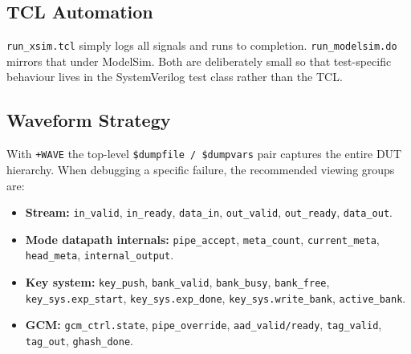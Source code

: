 \documentclass[conference,10pt,a4paper]{IEEEtran}
\begin{document}
\subsection{TCL Automation}
\texttt{run\_xsim.tcl} simply logs all signals and runs to completion.
\texttt{run\_modelsim.do} mirrors that under ModelSim.  Both are
deliberately small so that test-specific behaviour lives in the
SystemVerilog test class rather than the TCL.

\subsection{Waveform Strategy}
With \texttt{+WAVE} the top-level \texttt{\$dumpfile / \$dumpvars} pair
captures the entire DUT hierarchy.  When debugging a specific failure,
the recommended viewing groups are:
\begin{itemize}[leftmargin=*]
  \item \textbf{Stream:} \texttt{in\_valid}, \texttt{in\_ready},
        \texttt{data\_in}, \texttt{out\_valid}, \texttt{out\_ready},
        \texttt{data\_out}.
  \item \textbf{Mode datapath internals:} \texttt{pipe\_accept},
        \texttt{meta\_count}, \texttt{current\_meta}, \texttt{head\_meta},
        \texttt{internal\_output}.
  \item \textbf{Key system:} \texttt{key\_push}, \texttt{bank\_valid},
        \texttt{bank\_busy}, \texttt{bank\_free},
        \texttt{key\_sys.exp\_start}, \texttt{key\_sys.exp\_done},
        \texttt{key\_sys.write\_bank}, \texttt{active\_bank}.
  \item \textbf{GCM:} \texttt{gcm\_ctrl.state}, \texttt{pipe\_override},
        \texttt{aad\_valid/ready}, \texttt{tag\_valid},
        \texttt{tag\_out}, \texttt{ghash\_done}.
\end{itemize}
\end{document}
